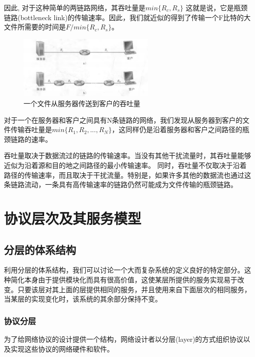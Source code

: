     因此, 对于这种简单的两链路网络，其吞吐量是$min\{R_c, R_s\}$ 这就是说，它是瓶颈链路(bottleneck link)的传输速率。因此，我们就近似的得到了传输一个F比特的大文件所需要的时间是$F/min\{R_c, R_s\}$。

\begin{figure}[!htbp]
    \centering
    \includegraphics[width=0.6\textwidth]{image/chapter01/简单链路的吞吐量.png}
    \caption{一个文件从服务器传送到客户的吞吐量}
\end{figure}

    对于一个在服务器和客户之间具有N条链路的网络，我们发现从服务器到客户的文件传输吞吐量是$min\{R_1, R_2,..., R_N\}$，这同样仍是沿着服务器和客户之间路径的瓶颈链路的速率。

    吞吐量取决于数据流过的链路的传输速率。当没有其他干扰流量时，其吞吐量能够近似为沿着源和目的地之间路径的最小传输速率。 同时，吞吐量不仅取决于沿着路径的传输速率，而且取决于干扰流量。特别是，如果许多其他的数据流也通过这条链路流动，一条具有高传输速率的链路仍然可能成为文件传输的瓶颈链路。

\section{协议层次及其服务模型}

\subsection{分层的体系结构}

    利用分层的体系结构，我们可以讨论一个大而复杂系统的定义良好的特定部分。这种简化本身由于提供模块化而具有很高价值，这使某层所提供的服务实现易于改变。只要该层对其上面的层提供相同的服务，并且使用来自下面层次的相同服务，当某层的实现变化时，该系统的其余部分保持不变。

\subsubsection{协议分层}

    为了给网络协议的设计提供一个结构，网络设计者以分层(layer)的方式组织协议以及实现这些协议的网络硬件和软件。

